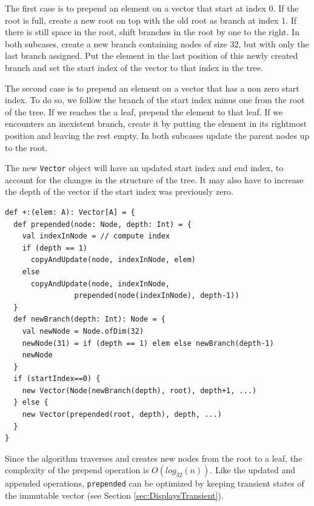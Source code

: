 The first case is to prepend an element on a vector that start at index 0. If the root is full, create a new root on top with the old root as branch at index 1. If there is still space in the root, shift branches in the root by one to the right. In both sub\-cases, create a new branch containing nodes of size 32, but with only the last branch assigned. Put the element in the last position of this newly created branch and set the start index of the vector to that index in the tree.

The second case is to prepend an element on a vector that has a non zero start index. To do so, we follow the branch of the start index minus one from the root of the tree. If we reaches the a leaf, prepend the element to that leaf. If we encounters an inexistent branch, create it by putting the element in its rightmost position and leaving the rest empty. In both sub\-cases update the parent nodes up to the root.

The new \texttt{Vector} object will have an updated start index and end index, to account for the changes in the structure of the tree. It may also have to increase the depth of the vector if the start index was previously zero. 

\begin{lstlisting}[frame=single]
def +:(elem: A): Vector[A] = {
  def prepended(node: Node, depth: Int) = {
    val indexInNode = // compute index
    if (depth == 1) 
      copyAndUpdate(node, indexInNode, elem)
    else 
      copyAndUpdate(node, indexInNode, 
                prepended(node(indexInNode), depth-1))
  }
  def newBranch(depth: Int): Node = {
    val newNode = Node.ofDim(32)
    newNode(31) = if (depth == 1) elem else newBranch(depth-1)
    newNode
  }
  if (startIndex==0) {
    new Vector(Node(newBranch(depth), root), depth+1, ...)
  } else {
    new Vector(prepended(root, depth), depth, ...)  
  }
}
\end{lstlisting}

Since the algorithm traverses and creates new nodes from the root to a leaf, the complexity of the prepend operation is $O(log_{32}(n))$. Like the updated and appended operations, \texttt{prepended} can be optimized by keeping transient states of the immutable vector (see Section \ref{sec:DisplaysTransient}).



